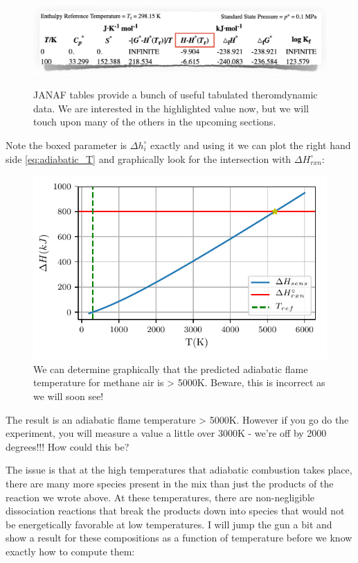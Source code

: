 \documentclass[twocolumn]{memoir} %
\begin{document}
\begin{figure}[H]
    \includegraphics[width=\columnwidth]{janaf_header}
    \label{fig:janaf_header}
    \caption{JANAF tables provide a bunch of useful tabulated theromdynamic data.  We are interested in
    the highlighted value now, but we will touch upon many of the others in the upcoming sections.}
\end{figure}
%
Note the boxed parameter is $\Delta h_{i}^\circ$ exactly and using it we can plot the right hand side
\cref{eq:adiabatic_T} and graphically look for the intersection with $\Delta H_{rxn}^\circ$:

\begin{figure}[H]
    \includegraphics[width=\columnwidth]{adiabatic_naive}
    \caption{We can determine graphically that the predicted adiabatic flame temperature
    for methane air is > 5000K.  Beware, this is incorrect as we will soon see!}
    \label{fig:adiabatic_naive}
\end{figure}
%
The result is an adiabatic flame temperature > 5000K.  However if you go do the experiment, you will measure
a value a little over 3000K - we're off by 2000 degrees!!!  How could this be?

The issue is that at the high temperatures that adiabatic combustion takes place, there are many more species
present in the mix than just the products of the reaction we wrote above.  At these temperatures, there are
non-negligible dissociation reactions that break the products down into species that would not be energetically
favorable at low temperatures.  I will jump the gun a bit and show a result for these compositions as a function
of temperature before we know exactly how to compute them:
\end{document}
